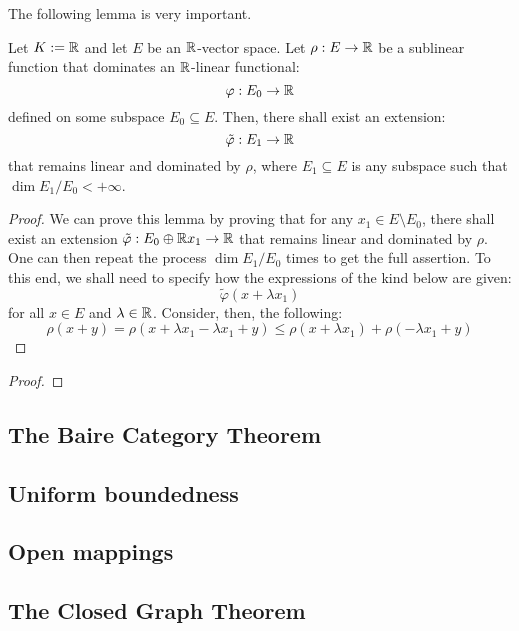         The following lemma is very important.
        \begin{lemma} \label{lemma: sublinear_functions_extend_finitely}
            Let $K := \mathbb{R}$ and let $E$ be an $\mathbb{R}$-vector space. Let $\rho: E \to \mathbb{R}$ be a sublinear function that dominates an $\mathbb{R}$-linear functional:
                $$\varphi: E_0 \to \mathbb{R}$$
            defined on some subspace $E_0 \subseteq E$. Then, there shall exist an extension:
                $$\tilde{\varphi}: E_1 \to \mathbb{R}$$
            that remains linear and dominated by $\rho$, where $E_1 \subseteq E$ is any subspace such that $\dim E_1/E_0 < +\infty$. 
        \end{lemma}
            \begin{proof}
                We can prove this lemma by proving that for any $x_1 \in E \setminus E_0$, there shall exist an extension $\tilde{\varphi}: E_0 \oplus \mathbb{R} x_1 \to \mathbb{R}$ that remains linear and dominated by $\rho$. One can then repeat the process $\dim E_1/E_0$ times to get the full assertion. To this end, we shall need to specify how the expressions of the kind below are given:
                    $$\tilde{\varphi}( x + \lambda x_1 )$$
                for all $x \in E$ and $\lambda \in \mathbb{R}$. Consider, then, the following:
                    $$\rho(x + y) = \rho( x + \lambda x_1 - \lambda x_1 + y ) \leq \rho(x + \lambda x_1) + \rho(-\lambda x_1 + y)$$
            \end{proof}
        \begin{theorem}
            
        \end{theorem}
            \begin{proof}
                
            \end{proof}

    \subsection{The Baire Category Theorem}

    \subsection{Uniform boundedness}

    \subsection{Open mappings}

    \subsection{The Closed Graph Theorem}